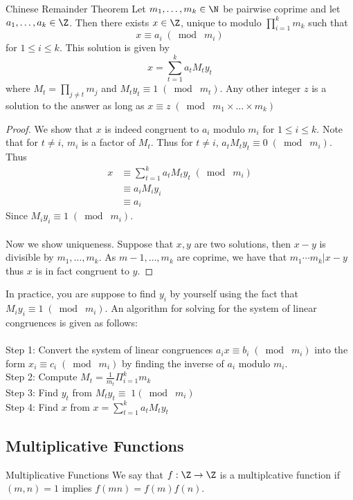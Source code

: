 \documentclass[a4paper]{article}
\begin{document}
\begin{thm}{Chinese Remainder Theorem}{} Let $m_1,\dots,m_k\in\N$ be pairwise coprime and let $a_1,\dots,a_k\in\Z$. Then there exists $x\in\Z$, unique to modulo $\prod_{i=1}^km_k$ such that $$x\equiv a_i\;(\bmod\; m_i)$$ for $1\leq i\leq k$. This solution is given by $$x=\sum_{t=1}^ka_tM_ty_t$$ where $M_t=\prod_{j\neq t}m_j$ and $M_ty_t\equiv1\;(\bmod\; m_t)$. Any other integer $z$ is a solution to the answer as long as $x\equiv z\;(\bmod\; m_1\times\dots\times m_k)$\tcbline
\begin{proof}
We show that $x$ is indeed congruent to $a_i$ modulo $m_i$ for $1\leq i\leq k$. Note that for $t\neq i$, $m_i$ is a factor of $M_t$. Thus for $t\neq i$, $a_tM_ty_t\equiv0\;(\bmod\; m_i)$. Thus
\begin{align*}
x&\equiv\sum_{t=1}^ka_tM_ty_t\;(\bmod\; m_i)\\
&\equiv a_iM_iy_i\\
&\equiv a_i
\end{align*}
Since $M_iy_i\equiv 1\;(\bmod\; m_i)$. \\~\\
Now we show uniqueness. Suppose that $x,y$ are two solutions, then $x-y$ is divisible by $m_1,\dots,m_k$. As $m-1,\dots,m_k$ are coprime, we have that $m_1\cdots m_k|x-y$ thus $x$ is in fact congruent to $y$. 
\end{proof}
\end{thm}

In practice, you are suppose to find $y_i$ by yourself using the fact that $M_iy_i\equiv 1\;(\bmod\; m_i)$. An algorithm for solving for the system of linear congruences is given as follows: \\~\\
Step 1: Convert the system of linear congruences $a_ix\equiv b_i\;(\bmod\; m_i)$ into the form $x_i\equiv c_i\;(\bmod\; m_i)$ by finding the inverse of $a_i$ modulo $m_i$. \\
Step 2: Compute $M_t=\frac{1}{m_t}\Pi_{i=1}^km_k$\\
Step 3: Find $y_t$ from $M_ty_t\equiv\;1(\bmod\; m_i)$\\
Step 4: Find $x$ from $x=\sum_{t=1}^ka_tM_ty_t$

\subsection{Multiplicative Functions}
\begin{defn}{Multiplicative Functions}{} We say that $f:\Z\to\Z$ is a multiplcative function if $(m,n)=1$ implies $f(mn)=f(m)f(n)$. 
\end{defn}
\end{document}

